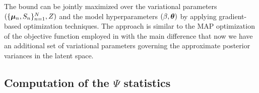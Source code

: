 \documentclass[twoside,times]{article}
\begin{document}
The bound can be jointly maximized over the variational parameters
$(\{\bm{\mu}_n,S_n\}_{n=1}^N, Z)$ and the model hyperparameters
$(\beta,\boldsymbol{\theta})$ by applying gradient-based optimization
techniques. The approach is similar to the MAP optimization of the
objective function employed in \cite{Lawrence:pnpca05} with the main
difference that now we have an additional set of variational
parameters governing the 
approximate posterior variances in the latent space. 


\subsection{Computation of the $\Psi$ statistics \label{sec:psiStats}} 
\end{document}
